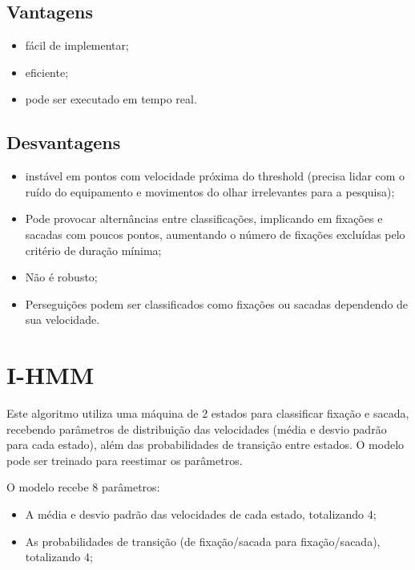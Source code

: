 \documentclass[brazil,]{report}
\begin{document}
\subsection{Vantagens}\label{vantagens}

\begin{itemize}
\itemsep1pt\parskip0pt
\item
  fácil de implementar;
\item
  eficiente;
\item
  pode ser executado em tempo real.
\end{itemize}

\subsection{Desvantagens}\label{desvantagens}

\begin{itemize}
\itemsep1pt\parskip0pt
\item
  instável em pontos com velocidade próxima do threshold (precisa lidar
  com o ruído do equipamento e movimentos do olhar irrelevantes para a
  pesquisa);
\item
  Pode provocar alternâncias entre classificações, implicando em
  fixações e sacadas com poucos pontos, aumentando o número de fixações
  excluídas pelo critério de duração mínima;
\item
  Não é robusto;
\item
  Perseguições podem ser classificados como fixações ou sacadas
  dependendo de sua velocidade.
\end{itemize}

\section{\gls{I-HMM}}\label{section-1}

Este algoritmo utiliza uma máquina de 2 estados para classificar fixação
e sacada, recebendo parâmetros de distribuição das velocidades (média e
desvio padrão para cada estado), além das probabilidades de transição
entre estados. O modelo pode ser treinado para reestimar os parâmetros.

O modelo recebe 8 parâmetros:

\begin{itemize}
\itemsep1pt\parskip0pt
\item
  A média e desvio padrão das velocidades de cada estado, totalizando 4;
\item
  As probabilidades de transição (de fixação/sacada para
  fixação/sacada), totalizando 4;
\end{itemize}
\end{document}
